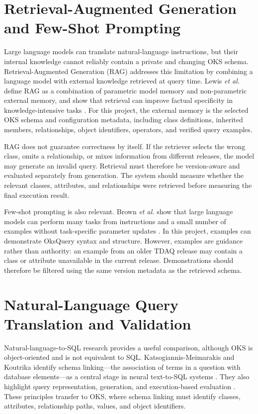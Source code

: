 \documentclass[12pt, a4paper]{report}
\begin{document}
\section{Retrieval-Augmented Generation and Few-Shot Prompting}
Large language models can translate natural-language instructions, but their
internal knowledge cannot reliably contain a private and changing OKS schema.
Retrieval-Augmented Generation (RAG) addresses this limitation by combining a
language model with external knowledge retrieved at query time. Lewis
\textit{et al.} define RAG as a combination of parametric model memory and
non-parametric external memory, and show that retrieval can improve factual
specificity in knowledge-intensive tasks \cite{rag}. For this project, the
external memory is the selected OKS schema and configuration metadata,
including class definitions, inherited members, relationships, object
identifiers, operators, and verified query examples.

RAG does not guarantee correctness by itself. If the retriever selects the
wrong class, omits a relationship, or mixes information from different
releases, the model may generate an invalid query. Retrieval must therefore be
version-aware and evaluated separately from generation. The system should
measure whether the relevant classes, attributes, and relationships were
retrieved before measuring the final execution result.

Few-shot prompting is also relevant. Brown \textit{et al.} show that large
language models can perform many tasks from instructions and a small number of
examples without task-specific parameter updates \cite{gpt3}. In this project,
examples can demonstrate OksQuery syntax and structure. However, examples are
guidance rather than authority: an example from an older TDAQ release may
contain a class or attribute unavailable in the current release.
Demonstrations should therefore be filtered using the same version metadata
as the retrieved schema.

\section{Natural-Language Query Translation and Validation}
Natural-language-to-SQL research provides a useful comparison, although OKS
is object-oriented and is not equivalent to SQL. Katsogiannis-Meimarakis and
Koutrika identify schema linking---the association of terms in a question with
database elements---as a central stage in neural text-to-SQL systems
\cite{text2sql_survey}. They also highlight query representation, generation,
and execution-based evaluation \cite{text2sql_survey}. These principles
transfer to OKS, where schema linking must identify classes, attributes,
relationship paths, values, and object identifiers.
\end{document}
